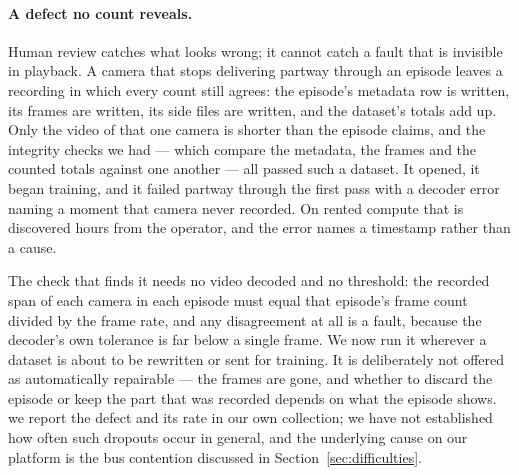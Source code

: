 \paragraph{A defect no count reveals.} Human review catches what looks wrong;
it cannot catch a fault that is invisible in playback. A camera that stops
delivering partway through an episode leaves a recording in which every count
still agrees: the episode's metadata row is written, its frames are written,
its side files are written, and the dataset's totals add up. Only the video of
that one camera is shorter than the episode claims, and the integrity checks we
had --- which compare the metadata, the frames and the counted totals against
one another --- all passed such a dataset. It opened, it began training, and it
failed partway through the first pass with a decoder error naming a moment that
camera never recorded. On rented compute that is discovered hours from the
operator, and the error names a timestamp rather than a cause.

The check that finds it needs no video decoded and no threshold: the recorded
span of each camera in each episode must equal that episode's frame count
divided by the frame rate, and any disagreement at all is a fault, because the
decoder's own tolerance is far below a single frame. We now run it wherever a
dataset is about to be rewritten or sent for training. It is deliberately not
offered as automatically repairable --- the frames are gone, and whether to
discard the episode or keep the part that was recorded depends on what the
episode shows. \unjustified{} we report the defect and its rate in our own
collection; we have not established how often such dropouts occur in general,
and the underlying cause on our platform is the bus contention discussed in
Section~\ref{sec:difficulties}.

